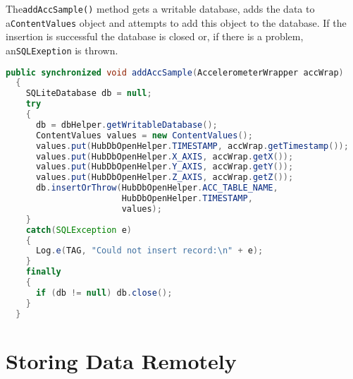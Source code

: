 \documentclass[11pt, a4paper, oneside, english]{scrbook}
\begin{document}
The\lstinline{addAccSample()} method gets a writable database, adds the data to a\lstinline{ContentValues} object and attempts to add this object to the database. If the insertion is successful the database is closed or, if there is a problem, an\lstinline{SQLExeption} is thrown.
\begin{lstlisting}[language=Java, numbers=none]
  public synchronized void addAccSample(AccelerometerWrapper accWrap)
  {
    SQLiteDatabase db = null;
    try
    {
      db = dbHelper.getWritableDatabase();
      ContentValues values = new ContentValues();
      values.put(HubDbOpenHelper.TIMESTAMP, accWrap.getTimestamp());
      values.put(HubDbOpenHelper.X_AXIS, accWrap.getX());
      values.put(HubDbOpenHelper.Y_AXIS, accWrap.getY());
      values.put(HubDbOpenHelper.Z_AXIS, accWrap.getZ());
      db.insertOrThrow(HubDbOpenHelper.ACC_TABLE_NAME,
                       HubDbOpenHelper.TIMESTAMP,
                       values);
    }
    catch(SQLException e)
    {
      Log.e(TAG, "Could not insert record:\n" + e);
    }
    finally
    {
      if (db != null) db.close();
    }
  }
\end{lstlisting}
\section{Storing Data Remotely} %
\label{sec:storing_data_remotely}
\end{document}
